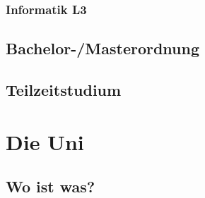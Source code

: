 \documentclass[12pt,a4paper]{scrartcl}
\begin{document}
	\subsubsection{Informatik L3}
	
\newpage

\subsection{Bachelor-/Masterordnung}

\subsection{Teilzeitstudium}
	
\newpage
\section{Die Uni}
	\subsection{Wo ist was?}
\end{document}
